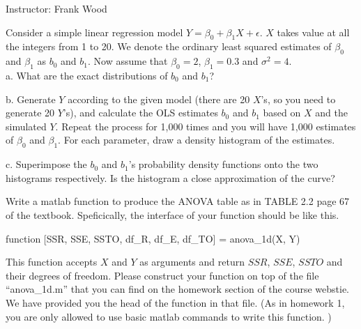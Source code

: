 \documentclass[12pt]{article}
\begin{document}
 \begin{center}
  Instructor: Frank Wood
 \end{center}
{}
\finishfirstpage



 {
  Consider a simple linear regression model $Y=\beta_0+\beta_1X+\epsilon$. $X$ takes value at all the integers from 1 to 20. We denote the ordinary least squared estimates of $\beta_0$ and $\beta_1$ as $b_0$ and $b_1$. Now assume that $\beta_0=2$, $\beta_1=0.3$ and $\sigma^2=4$.\\

 a. What are the exact distributions of $b_0$ and $b_1$?

 b. Generate $Y$ according to the given model (there are 20 $X$'s, so you need to generate 20 $Y$'s), and calculate the OLS estimates $b_0$ and $b_1$ based on $X$ and the simulated $Y$. Repeat the process for 1,000 times and you will have 1,000 estimates of $\beta_0$ and $\beta_1$. For each parameter, draw a density histogram of the estimates.

 c. Superimpose the $b_0$ and $b_1$'s probability density functions onto the two histograms respectively. Is the histogram a
 close approximation of the curve?
   }
 { \vfill
  \answer
} { }

 {
Write a matlab function to produce the ANOVA table as in TABLE 2.2 page 67 of the textbook. Speficically, the interface of your function should be like this.

\begin{center}                function [SSR, SSE, SSTO, df\_R, df\_E, df\_TO] = anova\_1d(X, Y)
\end{center}

This function accepts $X$ and $Y$ as arguments and return $SSR$, $SSE$, $SSTO$ and their degrees of freedom. Please construct your function on top of the file ``anova\_1d.m'' that you can find on the homework section of the course webstie. We have provided you the head of the function in that file. (As in homework 1, you are only allowed to use basic matlab commands to write this function. )

  }
 { \vfill
  \answer
} { }
\end{document}
